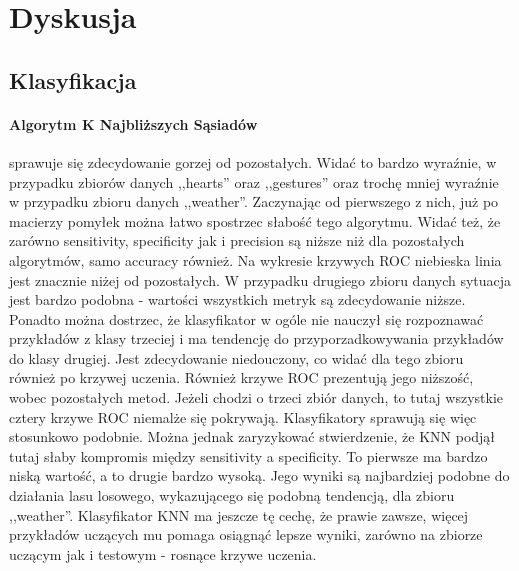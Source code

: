 \documentclass{classrep}
\begin{document}
    \section{Dyskusja}
    \label{summary} {

        \subsection{Klasyfikacja}
        \label{summary:classification} {
            \paragraph{Algorytm K Najbliższych Sąsiadów} sprawuje się zdecydowanie gorzej od pozostałych. Widać to bardzo wyraźnie, w przypadku zbiorów danych ,,hearts'' oraz ,,gestures'' oraz trochę mniej wyraźnie w przypadku zbioru danych ,,weather''. Zaczynając od pierwszego z nich, już po macierzy pomyłek można łatwo spostrzec słabość tego algorytmu. Widać też, że zarówno sensitivity, specificity jak i precision są niższe niż dla pozostałych algorytmów, samo accuracy również. Na wykresie krzywych ROC niebieska linia jest znacznie niżej od pozostałych. W przypadku drugiego zbioru danych sytuacja jest bardzo podobna - wartości wszystkich metryk są zdecydowanie niższe. Ponadto można dostrzec, że klasyfikator w ogóle nie nauczył się rozpoznawać przykładów z klasy trzeciej i ma tendencję do przyporzadkowywania przykładów do klasy drugiej. Jest zdecydowanie niedouczony, co widać dla tego zbioru również po krzywej uczenia. Również krzywe ROC prezentują jego niższość, wobec pozostałych metod. Jeżeli chodzi o trzeci zbiór danych, to tutaj wszystkie cztery krzywe ROC niemalże się pokrywają. Klasyfikatory sprawują się więc stosunkowo podobnie. Można jednak zaryzykować stwierdzenie, że KNN podjął tutaj słaby kompromis między sensitivity a specificity. To pierwsze ma bardzo niską wartość, a to drugie bardzo wysoką. Jego wyniki są najbardziej podobne do działania lasu losowego, wykazującego się podobną tendencją, dla zbioru ,,weather''. Klasyfikator KNN ma jeszcze tę cechę, że prawie zawsze, więcej przykładów uczących mu pomaga osiągnąć lepsze wyniki, zarówno na zbiorze uczącym jak i testowym - rosnące krzywe uczenia.
            
}}
\end{document}
